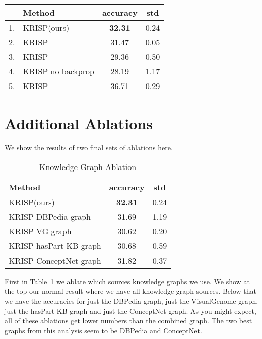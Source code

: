 \documentclass[final]{cvpr}
\providecommand{\ModelName}{KRISP\xspace}
\begin{document}
\begin{table*}[h]
\begin{center}
\begin{tabular}{@{}rlcc@{}}
\toprule
&Method &  accuracy &  std\\ 
\hline
1. & \ModelName  (ours) & \bf{32.31} & 0.24 \\
2. & \ModelName  & 31.47 & 0.05 \\
3. & \ModelName  & 29.36 & 0.50 \\
4. & \ModelName no backprop  & 28.19 & 1.17 \\
\hline
5. & \ModelName   & 36.71 & 0.29\\
\bottomrule
\end{tabular}
\end{center}
\caption{\ModelName Subpart Analysis on OK-VQA v1.1, with sample standard deviations. Mirrors Table~\ref{table:GraphAnalysis} in the main text.}
\label{table:GraphAnalysisstd}
\end{table*}


\section{Additional Ablations}
\label{appx:ablations}
We show the results of two final sets of ablations here.

\begin{table}[h]
\begin{center}
\begin{tabular}{@{}lcc@{}}
\toprule
Method & accuracy & std\\ \midrule
\ModelName (ours) & \bf{32.31} & 0.24 \\
\ModelName DBPedia graph & 31.69 & 1.19\\
\ModelName VG graph & 30.62 & 0.20 \\
\ModelName hasPart KB graph & 30.68 & 0.59\\
\ModelName ConceptNet graph & 31.82 & 0.37\\
\bottomrule
\end{tabular}
\end{center}
\caption{Knowledge Graph Ablation}
\label{table:graphablation}
\end{table}


First in Table~\ref{table:graphablation} we ablate which sources knowledge graphs we use. We show at the top our normal result where we have all  knowledge graph sources. Below that we have the accuracies for just the DBPedia graph, just the VisualGenome graph, just the hasPart KB graph and just the ConceptNet graph. As you might expect, all of these ablations get lower numbers than the combined graph. The two best graphs from this analysis seem to be DBPedia and ConceptNet.
\end{document}
